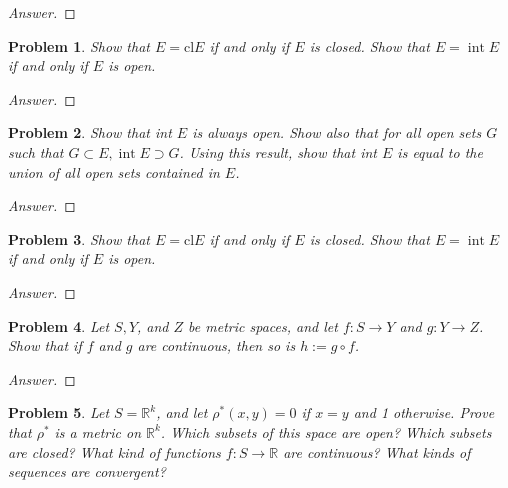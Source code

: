 \documentclass{article}
\newtheorem{problem}{Problem}[section]
\begin{document}
\begin{proof}[Answer]
    
\end{proof}

\begin{problem}
Show that $E=\mathrm{cl} E$ if and only if $E$ is closed. Show that $E=\operatorname{int} E$ if and only if $E$ is open.
\end{problem}

\begin{proof}[Answer]
    
\end{proof}

\begin{problem}
Show that int $E$ is always open. Show also that for all open sets $G$ such that $G \subset E, \operatorname{int} E \supset G$. Using this result, show that int $E$ is equal to the union of all open sets contained in $E$.
\end{problem}

\begin{proof}[Answer]
    
\end{proof}

\begin{problem}
Show that $E=\mathrm{cl} E$ if and only if $E$ is closed. Show that $E=\operatorname{int} E$ if and only if $E$ is open.
\end{problem}

\begin{proof}[Answer]
    
\end{proof}

\begin{problem}
Let $S, Y$, and $Z$ be metric spaces, and let $f: S \rightarrow Y$ and $g: Y \rightarrow Z$. Show that if $f$ and $g$ are continuous, then so is $h:=g \circ f$.
\end{problem}

\begin{proof}[Answer]
    
\end{proof}

\begin{problem}
Let $S=\mathbb{R}^{k}$, and let $\rho^{*}(x, y)=0$ if $x=y$ and 1 otherwise. Prove that $\rho^{*}$ is a metric on $\mathbb{R}^{k}$. Which subsets of this space are open? Which subsets are closed? What kind of functions $f: S \rightarrow \mathbb{R}$ are continuous? What kinds of sequences are convergent?
\end{problem}
\end{document}
